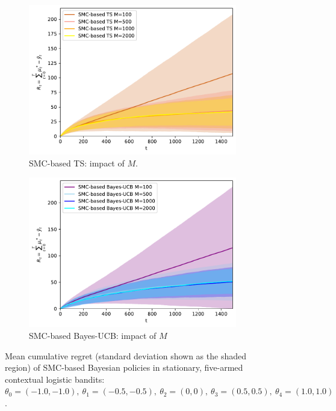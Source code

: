 \begin{figure}[!h]
	\begin{subfigure}[b]{0.46\textwidth}
		\centering
		\includegraphics[width=\textwidth]{./fods_figs/static/logistic/A5/theta-1._-1._-0.5_-0.5_0._0._0.5_0.5_1._1._allM_cumulative_regret_ts}
		\caption{SMC-based TS: impact of $M$.}
	\end{subfigure}
	\begin{subfigure}[b]{0.46\textwidth}
		\centering
		\includegraphics[width=\textwidth]{./fods_figs/static/logistic/A5/theta-1._-1._-0.5_-0.5_0._0._0.5_0.5_1._1._allM_cumulative_regret_bucb}
		\caption{SMC-based Bayes-UCB: impact of $M$}
	\end{subfigure}
	
	\caption{Mean cumulative regret (standard deviation shown as the shaded region) of SMC-based Bayesian policies in
		stationary, five-armed contextual logistic bandits:
		$\theta_0=(-1.0,-1.0), \ \theta_1=(-0.5,-0.5), \ \theta_2=(0,0), \ \theta_3=(0.5,0.5), \ \theta_4=(1.0,1.0)$.
	}
\end{figure}

